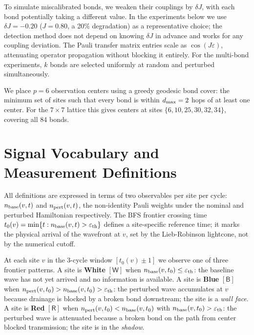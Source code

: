 \documentclass[11pt]{article}
\begin{document}
To simulate miscalibrated bonds, we weaken their couplings by $\delta J$,
with each bond potentially taking a different value. In the experiments below
we use $\delta J = -0.20$ ($J = 0.80$, a 20\% degradation) as a representative
choice; the detection method does not depend on knowing $\delta J$ in advance
and works for any coupling deviation. The Pauli transfer matrix entries scale as
$\cos(J\varepsilon)$, attenuating operator propagation without blocking it entirely.
For the multi-bond experiments, $k$ bonds are selected uniformly at random and perturbed simultaneously.

We place $p=6$ observation centers using a greedy geodesic bond cover: the
minimum set of sites such that every bond is within $d_{\rm max}=2$ hops of
at least one center. For the $7\times7$ lattice this gives centers at sites
$\{6, 10, 25, 30, 32, 34\}$, covering all 84 bonds.

\section{Signal Vocabulary and Measurement Definitions}
\label{sec:vocab}

All definitions are expressed in terms of two observables per site per
cycle: $n_{\rm base}(v,t)$ and $n_{\rm pert}(v,t)$, the non-identity
Pauli weights under the nominal and perturbed Hamiltonian
respectively.  The BFS frontier crossing time $t_0(v) = \min\{t :
n_{\rm base}(v,t) > \varepsilon_{\rm th}\}$ defines a site-specific
reference time; it marks the physical arrival of the wavefront at $v$,
set by the Lieb-Robinson lightcone, not by the numerical cutoff. 

At each site $v$ in the 3-cycle window $[t_0(v) \pm 1]$ we observe one of three
frontier patterns. A site is \textbf{White} $[\mathsf{W}]$ when
$n_{\rm base}(v, t_0) \leq \varepsilon_{\rm th}$: the baseline wave has not yet
arrived and no information is available. A site is \textbf{Blue} $[\mathsf{B}]$
when $n_{\rm pert}(v, t_0) > n_{\rm base}(v, t_0) > \varepsilon_{\rm th}$: the
perturbed wave accumulates at $v$ because drainage is blocked by a broken bond
downstream; the site is a \emph{wall face}. A site is \textbf{Red} $[\mathsf{R}]$
when $n_{\rm pert}(v, t_0) < n_{\rm base}(v, t_0)$ with
$n_{\rm base}(v, t_0) > \varepsilon_{\rm th}$: the perturbed wave is attenuated
because a broken bond on the path from center blocked transmission; the site is
in the \emph{shadow}.
\end{document}
